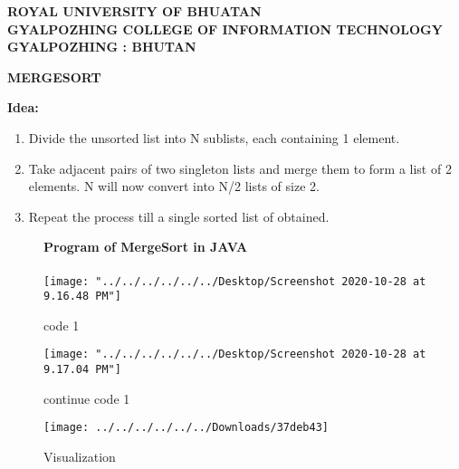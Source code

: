 \documentclass[12pt ,a4paper]{exam}
\author{Sonam Wangmo}
\begin{document}
	\begin{center}
		\textbf{ROYAL UNIVERSITY OF BHUATAN} \\
		\textbf{GYALPOZHING COLLEGE OF INFORMATION TECHNOLOGY} \\
		\textbf{GYALPOZHING : BHUTAN}
	\end{center}
	
	\vspace{0.1cm}
	
	\begin{center}
		\textbf{MERGESORT}
	\end{center}
	\vspace{1cm}
	\textbf{Idea: }	
	\begin{enumerate}
			\itemsep0em 
	 		\item Divide the unsorted list into N sublists, each containing 1 element.
	 		\item Take adjacent pairs of two singleton lists and merge them to form a list of 2 elements. N will now convert into N/2 lists of size 2.
	 		\item Repeat the process till a single sorted list of obtained.
	 \end{enumerate}
	\pagebreak
	\vspace{0.1cm}
	\begin{figure}\textbf{Program of MergeSort in JAVA}
		\vspace{0.2cm}  \\ \\
		\centering
		\texttt{[image: "../../../../../../Desktop/Screenshot 2020-10-28 at 9.16.48 PM"]}
		\caption{code 1}
		\label{fig:screenshot-2020-10-28-at-9}
	\end{figure}
	\pagebreak
	\vspace{0.2cm}
	\begin{figure}
		\centering
		\texttt{[image: "../../../../../../Desktop/Screenshot 2020-10-28 at 9.17.04 PM"]}
		\caption{continue code 1}
		\label{fig:screenshot-2020-10-28-at-9}
	\end{figure}
	
	\pagebreak
	\begin{figure}
		\centering
		\texttt{[image: ../../../../../../Downloads/37deb43]}
		\caption{Visualization}
		\label{fig:37deb43}
	\end{figure}
	
	\vspace{0.1cm}
	

	
\end{document}
